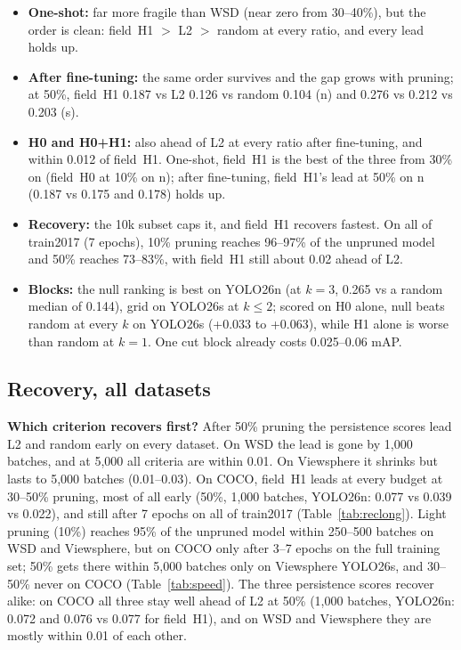 \documentclass[10pt]{article}
\begin{document}
\begin{itemize}
\item \textbf{One-shot:} far more fragile than WSD (near zero from 30--40\%), but the order is clean:
  field~H1 $>$ L2 $>$ random at every ratio, and every lead holds up.
\item \textbf{After fine-tuning:} the same order survives and the gap grows with pruning; at 50\%,
  field~H1 0.187 vs L2 0.126 vs random 0.104 (n) and 0.276 vs 0.212 vs 0.203 (s).
\item \textbf{H0 and H0+H1:} also ahead of L2 at every ratio after fine-tuning, and within 0.012
  of field~H1. One-shot, field~H1 is the best of the three from 30\% on (field~H0 at 10\% on n);
  after fine-tuning, field~H1's lead at 50\% on n (0.187 vs 0.175 and 0.178) holds up.
\item \textbf{Recovery:} the 10k subset caps it, and field~H1 recovers fastest. On all of train2017
  (7 epochs), 10\% pruning reaches 96--97\% of the unpruned model and 50\% reaches 73--83\%, with
  field~H1 still about 0.02 ahead of L2.
\item \textbf{Blocks:} the null ranking is best on YOLO26n (at $k = 3$, 0.265 vs a random median of
  0.144), grid on YOLO26s at $k \le 2$; scored on H0 alone, null beats random at every $k$ on
  YOLO26s (+0.033 to +0.063), while H1 alone is worse than random at $k = 1$. One cut block already
  costs 0.025--0.06 mAP.
\end{itemize}

\subsection{Recovery, all datasets}

\textbf{Which criterion recovers first?} After 50\% pruning the persistence scores lead L2 and random
early on every dataset. On WSD the lead is gone by 1,000 batches, and at 5,000 all criteria are
within 0.01. On Viewsphere it shrinks but lasts to 5,000 batches (0.01--0.03). On COCO, field~H1
leads at every budget at 30--50\% pruning, most of all early (50\%, 1,000 batches, YOLO26n: 0.077 vs
0.039 vs 0.022), and still after 7 epochs on all of train2017 (Table~\ref{tab:reclong}). Light
pruning (10\%) reaches 95\% of the unpruned model within 250--500 batches on WSD and Viewsphere, but on
COCO only after 3--7 epochs on the full training set; 50\% gets there within 5,000 batches only on
Viewsphere YOLO26s, and 30--50\% never on COCO (Table~\ref{tab:speed}). The three persistence scores
recover alike: on COCO all three stay well ahead of L2 at 50\% (1,000 batches, YOLO26n: 0.072 and
0.076 vs 0.077 for field~H1), and on WSD and Viewsphere they are mostly within 0.01 of each other.
\end{document}
